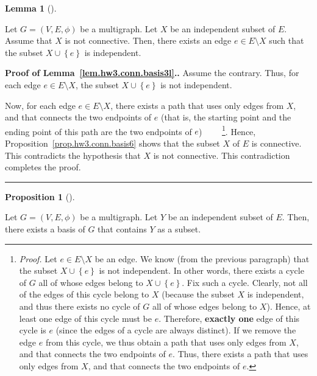 \documentclass[numbers=enddot,12pt,final,onecolumn,notitlepage]{scrartcl}%
\theoremstyle{definition}
\newtheorem{lem}[theo]{Lemma}
\newenvironment{lemma}[1][]
{\begin{lem}[#1]\begin{leftbar}}
{\end{leftbar}\end{lem}}
\newtheorem{prop}[theo]{Proposition}
\newenvironment{proposition}[1][]
{\begin{prop}[#1]\begin{leftbar}}
{\end{leftbar}\end{prop}}
\newenvironment{proof}[1][Proof]{\noindent\textbf{#1.} }{\ \rule{0.5em}{0.5em}}
\newcommand{\set}[1]{\left\{ #1 \right\}}
\newcommand{\tup}[1]{\left( #1 \right)}
\begin{document}
\begin{lemma} \label{lem.hw3.conn.basis3l}
Let $G = \tup{V, E, \phi}$ be a multigraph.
Let $X$ be an independent subset of $E$.
Assume that $X$ is not connective.
Then, there exists an edge $e \in E \setminus X$
such that the subset $X \cup \set{e}$ is independent.
\end{lemma}

\begin{proof}[Proof of Lemma~\ref{lem.hw3.conn.basis3l}.]
Assume the contrary.
Thus, for each edge $e \in E \setminus X$,
the subset $X \cup \set{e}$ is not independent.

Now, for each edge $e \in E \setminus X$, there
exists a path that uses only edges
from $X$, and that connects the two endpoints of $e$
(that is, the starting point and the ending point of
this path are the two endpoints of $e$)
\ \ \ \ \footnote{\textit{Proof.} Let $e \in E \setminus X$
  be an edge.
  We know (from the previous paragraph) that
  the subset $X \cup \set{e}$ is not independent.
  In other words, there exists a cycle of $G$
  all of whose edges belong to $X \cup \set{e}$.
  Fix such a cycle.
  Clearly, not all of the edges of this cycle belong to
  $X$ (because the subset $X$ is independent, and thus
  there exists no cycle of $G$ all of whose edges belong
  to $X$).
  Hence, at least one edge of this cycle must be $e$.
  Therefore, \textbf{exactly one} edge of this cycle is
  $e$ (since the edges of a cycle are always distinct).
  If we remove the edge $e$ from this cycle, we thus
  obtain a path that uses only edges from $X$, and that
  connects the two endpoints of $e$.
  Thus, there exists a path that uses only edges
  from $X$, and that connects the two endpoints of $e$.}.
Hence,
Proposition~\ref{prop.hw3.conn.basis6}
shows that the subset $X$ of $E$ is connective.
This contradicts the hypothesis that
$X$ is not connective.
This contradiction completes the proof.
\end{proof}

\begin{proposition} \label{prop.hw3.conn.basis3}
Let $G = \tup{V, E, \phi}$ be a multigraph.
Let $Y$ be an independent subset of $E$.
Then, there exists a basis of $G$ that contains $Y$ as a subset.
\end{proposition}
\end{document}
